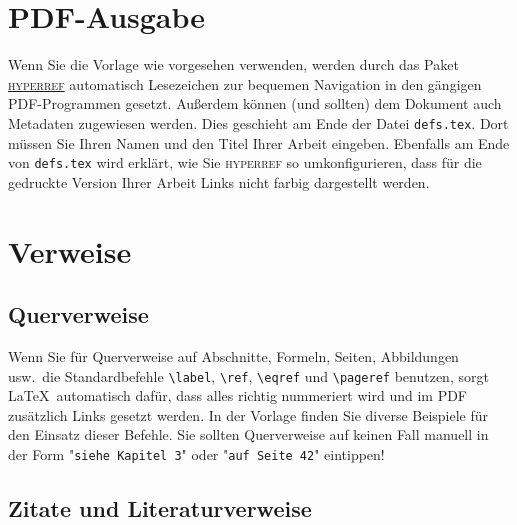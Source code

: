 \section{PDF-Ausgabe}

Wenn Sie die Vorlage wie vorgesehen verwenden, werden durch das Paket
\href{https://ctan.org/pkg/hyperref}{\textsc{hyperref}} automatisch
Lesezeichen zur bequemen Navigation in den gängigen PDF-Programmen gesetzt.
Außerdem können (und sollten) dem Dokument auch Metadaten zugewiesen werden.
Dies geschieht am Ende der Datei \texttt{defs.tex}.  Dort müssen Sie Ihren
Namen und den Titel Ihrer Arbeit eingeben.
Ebenfalls am Ende von \texttt{defs.tex} wird erklärt, wie Sie
\textsc{hyperref} so umkonfigurieren, dass für die gedruckte Version Ihrer
Arbeit Links nicht farbig dargestellt werden.

\section{Verweise}

\subsection{Querverweise}\label{sec-ref}

Wenn Sie für Querverweise auf Abschnitte, Formeln, Seiten, Abbildungen usw.\
die Standardbefehle \verb|\label|, \verb|\ref|, \verb|\eqref| und
\verb|\pageref| benutzen, sorgt \LaTeX\ automatisch dafür, dass alles richtig
nummeriert wird und im PDF zusätzlich Links gesetzt werden.  In der Vorlage
finden Sie diverse Beispiele für den Einsatz dieser Befehle.  Sie sollten
Querverweise auf keinen Fall manuell in der Form "\texttt{siehe Kapitel~3}"
oder "\texttt{auf Seite~42}" eintippen!

\subsection{Zitate und Literaturverweise}\label{sec-litref}

